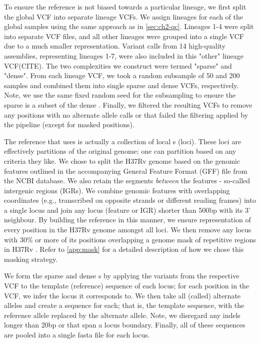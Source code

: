 To ensure the reference \prg{} is not biased towards a particular lineage, we first split the global \cryptic{} VCF into separate lineage VCFs. We assign lineages for each of the global samples using the same approach as in \autoref{sec:ch2-qc}. Lineages 1-4 were split into separate VCF files, and all other lineages were grouped into a single VCF due to a much smaller representation. Variant calls from 14 high-quality \mtb{} assemblies, representing lineages 1-7, were also included in this "other" lineage VCF(CITE). The two \prg{} complexities we construct were termed "sparse" and "dense". From each lineage VCF, we took a random subsample of 50 and 200 samples and combined them into single sparse and dense VCFs, respectively. Note, we use the same fixed random seed for the subsampling to ensure the sparse \prg{} is a subset of the dense \prg{}. Finally, we filtered the resulting VCFs to remove any positions with no alternate allele calls or that failed the filtering applied by the \cryptic{} pipeline  (except for masked positions).  

The reference \prg{} that \pandora{} uses is actually a collection of local \prg{}s (loci). These loci are effectively partitions of the original genome; one can partition based on any criteria they like. We chose to split the H37Rv genome based on the genomic features outlined in the accompanying General Feature Format (GFF) file from the NCBI database. We also retain the segments \emph{between} the features - so-called intergenic regions (IGRs). We combine genomic features with overlapping coordinates (e.g., transcribed on opposite strands or different reading frames) into a single locus and join any locus (feature or IGR) shorter than 500bp with its 3' neighbour. By building the reference \prg{} in this manner, we ensure representation of every position in the H37Rv genome amongst all loci. We then remove any locus with 30\% or more of its positions overlapping a genome mask of repetitive regions in H37Rv \cite{tbmask2014}. Refer to \autoref{app:mask} for a detailed description of how we chose this masking strategy.

We form the sparse and dense \prg{}s by applying the variants from the respective VCF to the template (reference) sequence of each locus; for each position in the VCF, we infer the locus it corresponds to. We then take all (called) alternate alleles and create a sequence for each; that is, the template sequence, with the reference allele replaced by the alternate allele. Note, we disregard any indels longer than 20bp or that span a locus boundary. Finally, all of these sequences are pooled into a single fasta file for each locus. 

